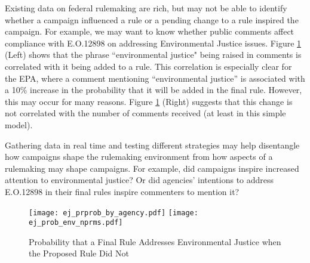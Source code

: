 \documentclass{article}
\begin{document}

\noindent
Existing data on federal rulemaking are rich, but may not be able to identify whether a campaign influenced a rule or a pending change to a rule inspired the campaign.
For example, we may want to know whether public comments affect compliance with E.O.12898 on addressing Environmental Justice issues. Figure \ref{ejlogitagencies} (Left) shows that %
the phrase ``environmental justice" being raised in comments is correlated with it being added to a rule. This correlation is especially clear for the EPA, where a comment mentioning ``environmental justice'' is associated with a 10\% increase in the probability that it will be added in the final rule. However, this may occur for many reasons. Figure \ref{ejlogitagencies} (Right) suggests that this change is not correlated with the number of comments received (at least in this simple model). %

Gathering data in real time and testing different strategies may help disentangle how campaigns shape the rulemaking environment from how aspects of a rulemaking may shape campaigns. For example, did campaigns inspire increased attention to environmental justice? Or did agencies' intentions to address E.O.12898 in their final rules inspire commenters to mention it? %

\begin{figure}[ht!]
\centering
\caption{Probability that a Final Rule Addresses Environmental Justice when the Proposed Rule Did Not}
\texttt{[image: ej\_prprob\_by\_agency.pdf]}
\texttt{[image: ej\_prob\_env\_nprms.pdf]}
\label{ejlogitagencies}
\end{figure}
\end{document}
